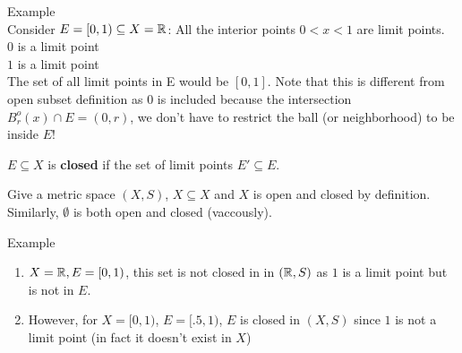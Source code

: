 \documentclass[a4paper]{article}
\begin{document}
\begin{remark}{Example} \\
  Consider $E = [0,1) \subseteq X = \mathbb{R}$:
  All the interior points $0 < x < 1$ are limit points. \\
  $0$ is a limit point \\
  $1$ is a limit point \\
  The set of all limit points in E would be $[0,1]$. Note that this is different from open subset definition as 0 is included
  because the intersection $B_r^o (x) \cap E = (0,r)$, we don't have to restrict the ball (or neighborhood) to be inside $E$!
\end{remark}

\begin{definition}
  $E \subseteq X$ is \textbf{closed} if the set of limit points $E' \subseteq E$.
\end{definition}

\begin{note}
  Give a metric space $\left( X, S \right)$, $X \subseteq X$ and $X$ is open and closed by definition. Similarly, $\emptyset$ is 
  both open and closed (vaccously).
\end{note}

\begin{remark}{Example}\\
 
  \begin{enumerate}
    \item $X = \mathbb{R}, E = [0,1)$, this set is not closed in in $(\mathbb{R},S)$ as $1$ is a limit point but is not in $E$. 
    \item However, for $X=[0,1)$, $E=[.5,1)$, $E$ is closed in $\left( X,S \right)$ since $1$ is not a limit point (in fact it doesn't exist
      in $X$)
  \end{enumerate}
\end{remark}
\end{document}
